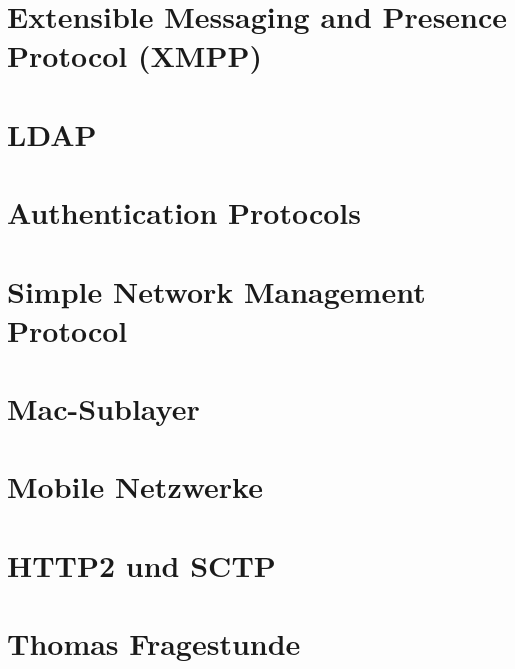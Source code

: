 \documentclass{article} %
\begin{document}

\section{Extensible Messaging and Presence Protocol (XMPP)}


\section{LDAP}


\section{Authentication Protocols}


\section{Simple Network Management Protocol}


\section{Mac-Sublayer}


\section{Mobile Netzwerke}


\section{HTTP2 und SCTP}


\section{Thomas Fragestunde}
\end{document}
